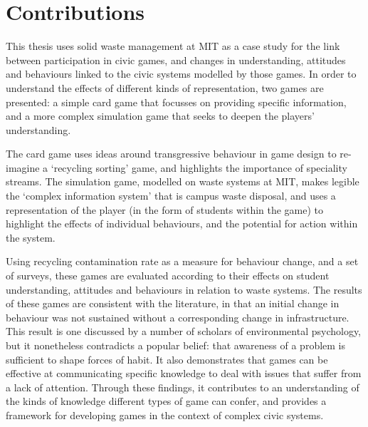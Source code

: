 \documentclass[nofonts,nols,justified,nobib]{tufte-book}
\begin{document}
\newpage

\section*{Contributions}
This thesis uses solid waste management at MIT as a case study for the link between participation in civic games, and changes in understanding, attitudes and behaviours linked to the civic systems modelled by those games. In order to understand the effects of different kinds of representation, two games are presented: a simple card game that focusses on providing specific information, and a more complex simulation game that seeks to deepen the players' understanding.

The card game uses ideas around transgressive behaviour in game design to re-imagine a `recycling sorting' game, and highlights the importance of speciality streams. The  simulation game, modelled on waste systems at MIT, makes legible the `complex information system' that is campus waste disposal, and uses a representation of the player (in the form of students within the game) to highlight the effects of individual behaviours, and the potential for action within the system. 

Using recycling contamination rate as a measure for behaviour change, and a set of surveys, these games are evaluated according to their effects on student understanding, attitudes and behaviours in relation to waste systems. The results of these games are consistent with the literature, in that an initial change in behaviour was not sustained without a corresponding change in infrastructure. This result is one discussed by a number of scholars of environmental psychology, but it nonetheless contradicts a popular belief: that awareness of a problem is sufficient to shape forces of habit. It also demonstrates that games can be effective at communicating specific knowledge to deal with issues that suffer from a lack of attention. Through these findings, it contributes to an understanding of the kinds of knowledge different types of game can confer, and provides a framework for developing games in the context of complex civic systems.

\end{document}
